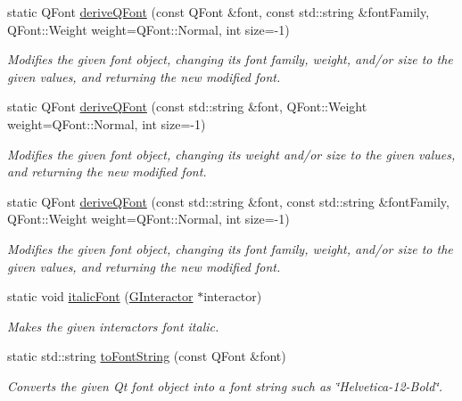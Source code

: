 \begin{DoxyCompactItemize}
static Q\+Font \mbox{\hyperlink{classGFont_aa0a91decdb8d9bec6e875ebac9d81c97}{derive\+Q\+Font}} (const Q\+Font \&font, const std\+::string \&font\+Family, Q\+Font\+::\+Weight weight=Q\+Font\+::\+Normal, int size=-\/1)
\begin{DoxyCompactList}\small\item\em Modifies the given font object, changing its font family, weight, and/or size to the given values, and returning the new modified font. \end{DoxyCompactList}\item 
static Q\+Font \mbox{\hyperlink{classGFont_a6fdde28adfdce9b43b7eb4d4a47ca23b}{derive\+Q\+Font}} (const std\+::string \&font, Q\+Font\+::\+Weight weight=Q\+Font\+::\+Normal, int size=-\/1)
\begin{DoxyCompactList}\small\item\em Modifies the given font object, changing its weight and/or size to the given values, and returning the new modified font. \end{DoxyCompactList}\item 
static Q\+Font \mbox{\hyperlink{classGFont_a50c41ebc7de0a4a038852b0764d3a6f2}{derive\+Q\+Font}} (const std\+::string \&font, const std\+::string \&font\+Family, Q\+Font\+::\+Weight weight=Q\+Font\+::\+Normal, int size=-\/1)
\begin{DoxyCompactList}\small\item\em Modifies the given font object, changing its font family, weight, and/or size to the given values, and returning the new modified font. \end{DoxyCompactList}\item 
static void \mbox{\hyperlink{classGFont_a3f37291f3e288376754c056a10b64f90}{italic\+Font}} (\mbox{\hyperlink{classGInteractor}{G\+Interactor}} $\ast$interactor)
\begin{DoxyCompactList}\small\item\em Makes the given interactor\textquotesingle{}s font italic. \end{DoxyCompactList}\item 
static std\+::string \mbox{\hyperlink{classGFont_a1e897239fcf0fa78a33f3021a98b0029}{to\+Font\+String}} (const Q\+Font \&font)
\begin{DoxyCompactList}\small\item\em Converts the given Qt font object into a font string such as \char`\"{}\+Helvetica-\/12-\/\+Bold\char`\"{}. \end{DoxyCompactList}\item 

\end{DoxyCompactItemize}
